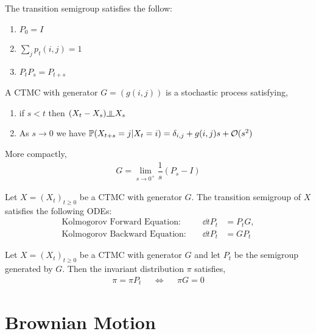 \documentclass[12pt]{article}
\begin{document}
\begin{theorem}
The transition semigroup satisfies the follow:
\begin{enumerate}[nolistsep]
    \item \( P_0 = I \)
    \item \( \sum_j  p_t(i,j) = 1 \)
    \item \( P_tP_s = P_{t+s} \)
\end{enumerate}
\end{theorem}

\begin{definition}
A CTMC with generator \( G = (g(i,j)) \) is a stochastic process satisfying,
\begin{enumerate}[nolistsep]
    \item if \( s<t \) then \( (X_t - X_s) \indep X_s \)
    \item As \( s\to 0 \) we have \( \mathbb{P}(X_{t+s} = j | X_t = i) = \delta_{i,j} + g(i,j) s + \mathcal{O}(s^2) \)
\end{enumerate}

More compactly,
\begin{align*}
    G = \lim_{s\to 0^+} \dfrac{1}{s} \left( P_s - I \right)
\end{align*}
\end{definition}

\begin{theorem}
Let \( X = (X_t)_{t\geq 0} \) be a CTMC with generator \( G \). The transition semigroup of \( X \) satisfies the following ODEs:
\begin{align*}
    \text{Kolmogorov Forward Equation: } && \dd{}{t} P_t &= P_t G, \\
    \text{Kolmogorov Backward Equation: } && \dd{}{t} P_t &= G P_t
\end{align*}
\end{theorem}

\begin{theorem}
Let \( X = (X_t)_{t\geq 0} \) be a CTMC with generator \( G \) and let \( P_t \) be the semigroup generated by \( G \). Then the invariant distribution \( \pi \) satisfies,
\begin{align*}
    \pi = \pi P_t && \Longleftrightarrow && \pi G = 0
\end{align*}
\end{theorem}


\section{Brownian Motion}
\end{document}
